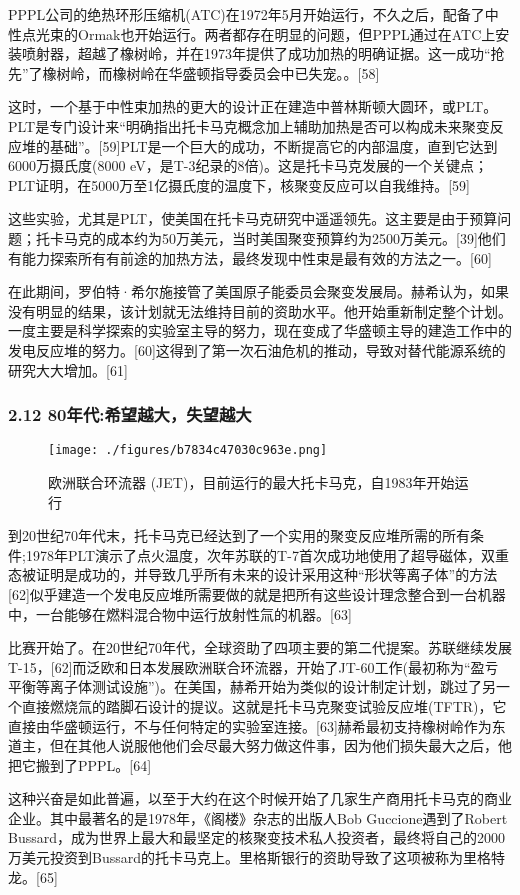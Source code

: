 PPPL公司的绝热环形压缩机(ATC)在1972年5月开始运行，不久之后，配备了中性点光束的Ormak也开始运行。两者都存在明显的问题，但PPPL通过在ATC上安装喷射器，超越了橡树岭，并在1973年提供了成功加热的明确证据。这一成功“抢先”了橡树岭，而橡树岭在华盛顿指导委员会中已失宠。。[58]

这时，一个基于中性束加热的更大的设计正在建造中普林斯顿大圆环，或PLT。PLT是专门设计来“明确指出托卡马克概念加上辅助加热是否可以构成未来聚变反应堆的基础”。[59]PLT是一个巨大的成功，不断提高它的内部温度，直到它达到6000万摄氏度(8000 eV，是T-3纪录的8倍)。这是托卡马克发展的一个关键点；PLT证明，在5000万至1亿摄氏度的温度下，核聚变反应可以自我维持。[59]

这些实验，尤其是PLT，使美国在托卡马克研究中遥遥领先。这主要是由于预算问题；托卡马克的成本约为50万美元，当时美国聚变预算约为2500万美元。[39]他们有能力探索所有有前途的加热方法，最终发现中性束是最有效的方法之一。[60]

在此期间，罗伯特·希尔施接管了美国原子能委员会聚变发展局。赫希认为，如果没有明显的结果，该计划就无法维持目前的资助水平。他开始重新制定整个计划。一度主要是科学探索的实验室主导的努力，现在变成了华盛顿主导的建造工作中的发电反应堆的努力。[60]这得到了第一次石油危机的推动，导致对替代能源系统的研究大大增加。[61]
\subsubsection{2.12 80年代:希望越大，失望越大}
\begin{figure}[ht]
\centering
\texttt{[image: ./figures/b7834c47030c963e.png]}
\caption{欧洲联合环流器 (JET)，目前运行的最大托卡马克，自1983年开始运行} \label{fig_TKMK_3}
\end{figure}
到20世纪70年代末，托卡马克已经达到了一个实用的聚变反应堆所需的所有条件;1978年PLT演示了点火温度，次年苏联的T-7首次成功地使用了超导磁体，双重态被证明是成功的，并导致几乎所有未来的设计采用这种“形状等离子体”的方法[62]似乎建造一个发电反应堆所需要做的就是把所有这些设计理念整合到一台机器中，一台能够在燃料混合物中运行放射性氚的机器。[63]

比赛开始了。在20世纪70年代，全球资助了四项主要的第二代提案。苏联继续发展T-15，[62]而泛欧和日本发展欧洲联合环流器，开始了JT-60工作(最初称为“盈亏平衡等离子体测试设施”)。在美国，赫希开始为类似的设计制定计划，跳过了另一个直接燃烧氚的踏脚石设计的提议。这就是托卡马克聚变试验反应堆(TFTR)，它直接由华盛顿运行，不与任何特定的实验室连接。[63]赫希最初支持橡树岭作为东道主，但在其他人说服他他们会尽最大努力做这件事，因为他们损失最大之后，他把它搬到了PPPL。[64]

这种兴奋是如此普遍，以至于大约在这个时候开始了几家生产商用托卡马克的商业企业。其中最著名的是1978年，《阁楼》杂志的出版人Bob Guccione遇到了Robert Bussard，成为世界上最大和最坚定的核聚变技术私人投资者，最终将自己的2000万美元投资到Bussard的托卡马克上。里格斯银行的资助导致了这项被称为里格特龙。[65]

